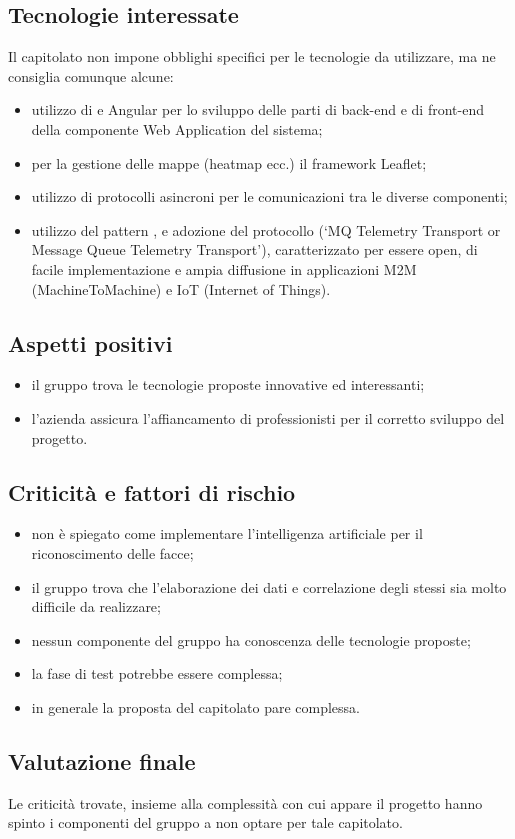 \subsection{Tecnologie interessate}
Il capitolato non impone obblighi specifici per le tecnologie da utilizzare, ma ne consiglia comunque alcune:
\begin{itemize}
\item utilizzo di  e Angular per lo sviluppo delle parti di back-end e di front-end della componente Web
Application del sistema;
\item per la gestione delle mappe (heatmap ecc.) il framework Leaflet;
\item utilizzo di protocolli asincroni per le comunicazioni tra le diverse componenti;
\item utilizzo del pattern , e adozione del protocollo  (‘MQ Telemetry Transport
or Message Queue Telemetry Transport’), caratterizzato per essere open, di facile implementazione
e ampia diffusione in applicazioni M2M (MachineToMachine) e IoT (Internet of Things).
\end{itemize}

\subsection{Aspetti positivi}
\begin{itemize}
\item il gruppo trova le tecnologie proposte innovative ed interessanti;
\item l'azienda assicura l'affiancamento di professionisti per il corretto sviluppo del progetto.
\end{itemize}

\subsection{Criticità e fattori di rischio}
\begin{itemize}
\item non è spiegato come implementare l'intelligenza artificiale per il riconoscimento delle facce;
\item il gruppo trova che l'elaborazione dei dati e correlazione degli stessi sia molto difficile da realizzare;
\item nessun componente del gruppo ha conoscenza delle tecnologie proposte;
\item la fase di test potrebbe essere complessa;
\item in generale la proposta del capitolato pare complessa.
\end{itemize}

\subsection{Valutazione finale}
Le criticità trovate, insieme alla complessità con cui appare il progetto hanno spinto i componenti del gruppo a non optare per tale capitolato.
